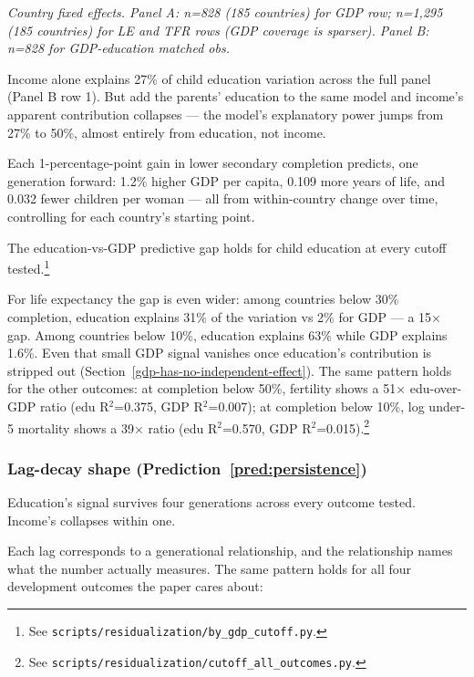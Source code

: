 \documentclass[12pt,letterpaper]{article}
\begin{document}
\emph{Country fixed effects. Panel A: n=828 (185 countries) for GDP row;
n=1,295 (185 countries) for LE and TFR rows (GDP coverage is sparser).
Panel B: n=828 for GDP-education matched obs.}

Income alone explains 27\% of child education variation across the
full panel (Panel B row 1). But add the parents' education to the same
model and income's apparent contribution collapses --- the
model's explanatory power jumps from 27\% to 50\%, almost entirely from
education, not income.

Each 1-percentage-point gain in lower secondary completion predicts, one
generation forward: 1.2\% higher GDP per capita, 0.109 more years of
life, and 0.032 fewer children per woman --- all from within-country
change over time, controlling for each country's starting point.

The education-vs-GDP predictive gap holds for child education at every
cutoff tested.\footnote{See
\texttt{scripts/residualization/by\_gdp\_cutoff.py}.}

For life expectancy the gap is even wider: among countries below 30\%
completion, education explains 31\% of the variation vs 2\% for GDP ---
a 15× gap. Among countries below 10\%, education explains 63\% while
GDP explains 1.6\%. Even that small GDP signal vanishes once education's
contribution is stripped out
(Section~\ref{gdp-has-no-independent-effect}). The same pattern holds
for the other outcomes: at completion below 50\%, fertility shows a
51× edu-over-GDP ratio (edu R$^2$=0.375, GDP R$^2$=0.007); at
completion below 10\%, log under-5 mortality shows a 39× ratio (edu
R$^2$=0.570, GDP R$^2$=0.015).\footnote{See
\texttt{scripts/residualization/cutoff\_all\_outcomes.py}.}

\subsubsection*{Lag-decay shape (Prediction~\ref{pred:persistence})}

Education's signal survives four generations across every outcome
tested. Income's collapses within one.

Each lag corresponds to a generational relationship, and the
relationship names what the number actually measures. The same pattern
holds for all four development outcomes the paper cares about:
\end{document}
